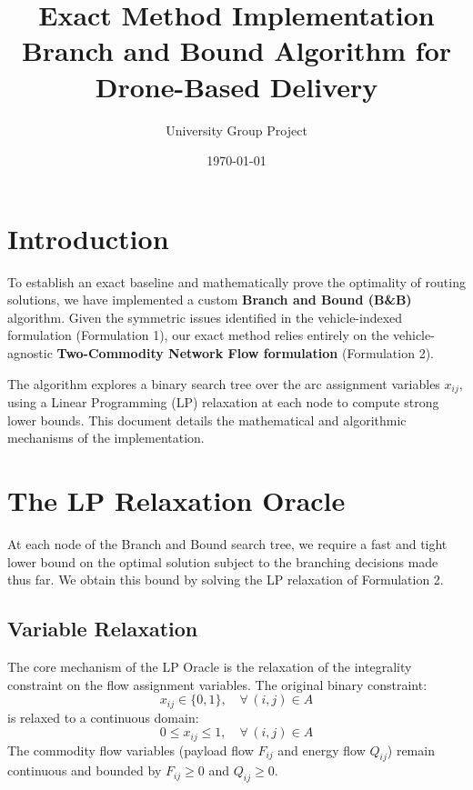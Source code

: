 \documentclass[11pt,a4paper]{article}
\title{\textbf{Exact Method Implementation}\\[0.3em]
\large Branch and Bound Algorithm for Drone-Based Delivery}
\author{University Group Project}
\date{\today}
\begin{document}
\maketitle

\section{Introduction}

To establish an exact baseline and mathematically prove the optimality of routing solutions, we have implemented a custom \textbf{Branch and Bound (B\&B)} algorithm. Given the symmetric issues identified in the vehicle-indexed formulation (Formulation 1), our exact method relies entirely on the vehicle-agnostic \textbf{Two-Commodity Network Flow formulation} (Formulation 2). 

The algorithm explores a binary search tree over the arc assignment variables $x_{ij}$, using a Linear Programming (LP) relaxation at each node to compute strong lower bounds. This document details the mathematical and algorithmic mechanisms of the implementation.

\section{The LP Relaxation Oracle}

At each node of the Branch and Bound search tree, we require a fast and tight lower bound on the optimal solution subject to the branching decisions made thus far. We obtain this bound by solving the LP relaxation of Formulation 2.

\subsection{Variable Relaxation}
The core mechanism of the LP Oracle is the relaxation of the integrality constraint on the flow assignment variables. The original binary constraint:
\[
  x_{ij} \in \{0, 1\}, \quad \forall\, (i,j) \in A
\]
is relaxed to a continuous domain:
\[
  0 \le x_{ij} \le 1, \quad \forall\, (i,j) \in A
\]
The commodity flow variables (payload flow $F_{ij}$ and energy flow $Q_{ij}$) remain continuous and bounded by $F_{ij} \ge 0$ and $Q_{ij} \ge 0$.
\end{document}
